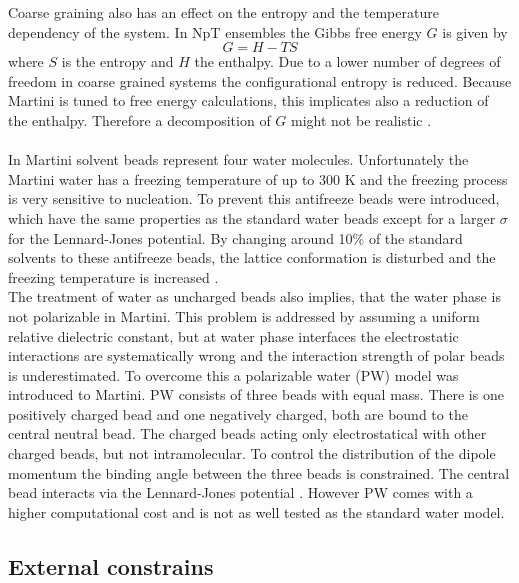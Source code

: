 Coarse graining also has an effect on the entropy and the temperature dependency of the system. In NpT ensembles the Gibbs free energy $G$ is given by
\begin{equation}
G = H - T S
\end{equation}
where $S$ is the entropy and $H$ the enthalpy. Due to a lower number of degrees of freedom in coarse grained systems the configurational entropy is reduced. Because Martini is tuned to free energy calculations, this implicates also a reduction of the enthalpy. Therefore a decomposition of $G$ might not be realistic \autocite[p. 6811]{martini22_check}.\\
\\
In Martini solvent beads represent four water molecules. Unfortunately the Martini water has a freezing temperature of up to 300 $\si{\kelvin}$ and the freezing process is very sensitive to nucleation. To prevent this antifreeze beads were introduced, which have the same properties as the standard water beads except for a larger $\sigma$ for the Lennard-Jones potential. By changing around 10\% of the standard solvents to these antifreeze beads, the lattice conformation is disturbed and the freezing temperature is increased \autocite[p. 7815]{martini}.\\
The treatment of water as uncharged beads also implies, that the water phase is not polarizable in Martini. This problem is addressed by assuming a uniform relative dielectric constant, but at water phase interfaces the electrostatic interactions are systematically wrong and the interaction strength of polar beads is underestimated. To overcome this a polarizable water (PW) model was introduced to Martini. PW consists of three beads with equal mass. There is one positively charged bead and one negatively charged, both are bound to the central neutral bead. The charged beads acting only electrostatical with other charged beads, but not intramolecular. To control the distribution of the dipole momentum the binding angle between the three beads is constrained. The central bead interacts via the Lennard-Jones potential \autocite{polarizableMartini}. However PW comes with a higher computational cost and is not as well tested as the standard water model.
\subsection{External constrains}
